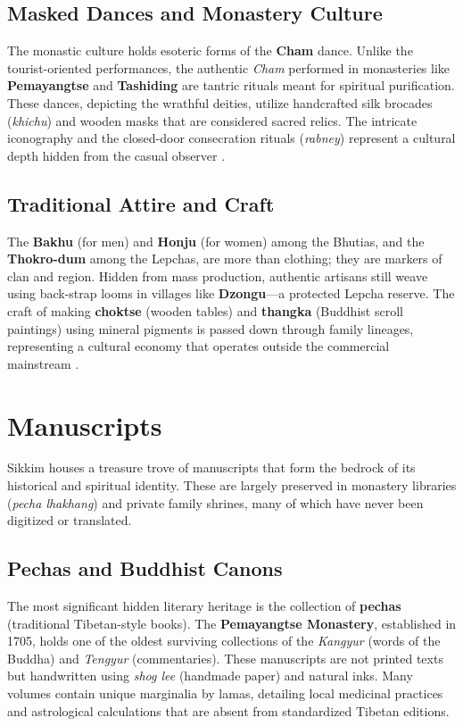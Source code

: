 \documentclass[12pt]{article}
\begin{document}
\subsection{Masked Dances and Monastery Culture}
The monastic culture holds esoteric forms of the \textbf{Cham} dance. Unlike the tourist-oriented performances, the authentic \textit{Cham} performed in monasteries like \textbf{Pemayangtse} and \textbf{Tashiding} are tantric rituals meant for spiritual purification. These dances, depicting the wrathful deities, utilize handcrafted silk brocades (\textit{khichu}) and wooden masks that are considered sacred relics. The intricate iconography and the closed-door consecration rituals (\textit{rabney}) represent a cultural depth hidden from the casual observer \cite{ponnusamy2015}.

\subsection{Traditional Attire and Craft}
The \textbf{Bakhu} (for men) and \textbf{Honju} (for women) among the Bhutias, and the \textbf{Thokro-dum} among the Lepchas, are more than clothing; they are markers of clan and region. Hidden from mass production, authentic artisans still weave using back-strap looms in villages like \textbf{Dzongu}—a protected Lepcha reserve. The craft of making \textbf{choktse} (wooden tables) and \textbf{thangka} (Buddhist scroll paintings) using mineral pigments is passed down through family lineages, representing a cultural economy that operates outside the commercial mainstream \cite{sharma2016}.

\section{Manuscripts}
Sikkim houses a treasure trove of manuscripts that form the bedrock of its historical and spiritual identity. These are largely preserved in monastery libraries (\textit{pecha lhakhang}) and private family shrines, many of which have never been digitized or translated.

\subsection{Pechas and Buddhist Canons}
The most significant hidden literary heritage is the collection of \textbf{pechas} (traditional Tibetan-style books). The \textbf{Pemayangtse Monastery}, established in 1705, holds one of the oldest surviving collections of the \textit{Kangyur} (words of the Buddha) and \textit{Tengyur} (commentaries). These manuscripts are not printed texts but handwritten using \textit{shog lee} (handmade paper) and natural inks. Many volumes contain unique marginalia by lamas, detailing local medicinal practices and astrological calculations that are absent from standardized Tibetan editions.
\end{document}
